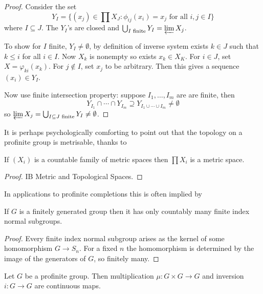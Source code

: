 \documentclass[a4paper]{article}
\begin{document}
\begin{proof}
  Consider the set
  \[
    Y_I = \{(x_j) \in \prod X_J: \phi_{ij}(x_i) = x_j \text{ for all } i, j \in I\}
  \]
  where \(I \subseteq J\). The \(Y_I\)'s are closed and \(\bigcup_{I \text{ finite}} Y_I = \varprojlim X_j\).

  To show for \(I\) finite, \(Y_I \ne \emptyset\), by definition of inverse system exists \(k \in J\)  such that \(k \leq i\) for all \(i \in I\). Now \(X_k\) is nonempty so exists \(x_k \in X_K\). For \(i \in J\), set \(X = \varphi_{ki}(x_k)\). For \(j \notin I\), set \(x_j\) to be arbitrary. Then this gives a sequence \((x_i) \in Y_I\).

  Now use finite intersection property: suppose \(I_1, \dots, I_m\) are are finite, then
  \[
    Y_{I_1} \cap \cdots \cap Y_{I_m} \supseteq Y_{I_1 \cup \cdots \cup I_m} \ne \emptyset
  \]
  so \(\varprojlim X_j = \bigcup_{I \subseteq J \text{ finite}} Y_I \ne \emptyset\).
\end{proof}

It is perhaps psychologically comforting to point out that the topology on a profinite group is metrisable, thanks to

\begin{proposition}
  If \((X_i)\) is a countable family of metric spaces then \(\prod X_i\) is a metric space.
\end{proposition}

\begin{proof}
  IB Metric and Topological Spaces.
\end{proof}

In applications to profinite completions this is often implied by

\begin{proposition}
  If \(G\) is a finitely generated group then it has only countably many finite index normal subgroups.
\end{proposition}

\begin{proof}
  Every finite index normal subgroup arises as the kernel of some homomorphism \(G \to S_n\). For a fixed \(n\) the homomorphism is determined by the image of the generators of \(G\), so finitely many.
\end{proof}

\begin{proposition}
  Let \(G\) be a profinite group. Then multiplication \(\mu: G \times G \to G\) and inversion \(i: G \to G\) are continuous maps.
\end{proposition}
\end{document}
